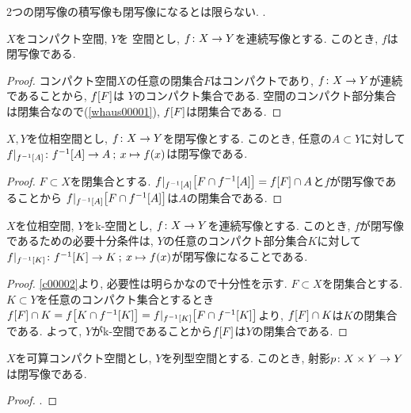 \documentclass[uplatex, dvipdfmx, a4paper, 12pt, class=jsbook, crop=false]{standalone}
\begin{document}
\begin{example}
	2つの閉写像の積写像も閉写像になるとは限らない.
	\WIP.
\end{example}

\begin{proposition}
	$ X $をコンパクト空間, $ Y $を \Hausdorff 空間とし, $ f\colon X\to Y $を連続写像とする.
	このとき, $ f $は閉写像である.
\end{proposition}

\begin{proof}
	コンパクト空間$ X $の任意の閉集合$ F $はコンパクトであり,
	$ f\colon X\to Y $が連続であることから, $ \mapset{f}{F} $は
	$ Y $のコンパクト集合である.
	\Hausdorff 空間のコンパクト部分集合は閉集合なので(\cref{whaus00001}),
	$ \mapset{f}{F} $は閉集合である.
\end{proof}

\begin{proposition}
	\label{c00002}
	$ X, Y $を位相空間とし, $ f\colon X\to Y $を閉写像とする.
	このとき, 任意の$ A \subset Y $に対して
	$ \morphto{f|_{\mapinvset{f}{A}}}{\mapinvset{f}{A}}{A}{x}{f(x)} $は閉写像である.
\end{proposition}

\begin{proof}
	$ F \subset X $を閉集合とする.
	$ \mapset{f|_{\mapinvset{f}{A}}}{F \cap \mapinvset{f}{A}}
	= \mapset{f}{F} \cap A $と$ f $が閉写像であることから
	$ \mapset{f|_{\mapinvset{f}{A}}}{F \cap \mapinvset{f}{A}} $は$ A $の閉集合である.
\end{proof}

\begin{proposition}
	$ X $を位相空間, $ Y $をk-空間とし, $ f\colon X\to Y $を連続写像とする.
	このとき, $ f $が閉写像であるための必要十分条件は, $ Y $の任意のコンパクト部分集合$ K $に対して
	$ \morphto{f|_{\mapinvset{f}{K}}}{\mapinvset{f}{K}}{K}{x}{f(x)} $が閉写像になることである.
\end{proposition}

\begin{proof}
	\cref{c00002}より, 必要性は明らかなので十分性を示す.
	$ F \subset X $を閉集合とする. $ K \subset Y $を任意のコンパクト集合とするとき
	$ \mapset{f}{F} \cap K = \mapset{f}{K \cap \mapinvset{f}{K}}
	= \mapset{f|_{\mapinvset{f}{K}}}{F \cap  \mapinvset{f}{K}} $より,
	$ \mapset{f}{F} \cap K $は$ K $の閉集合である.
	よって, $ Y $がk-空間であることから$ \mapset{f}{F} $は$ Y $の閉集合である.
\end{proof}

\begin{proposition}
	$ X $を可算コンパクト空間とし, $ Y $を列型空間とする. このとき, 射影$ p\colon X \times Y\to Y $は閉写像である.
\end{proposition}

\begin{proof}
	\WIP.
\end{proof}
\end{document}
